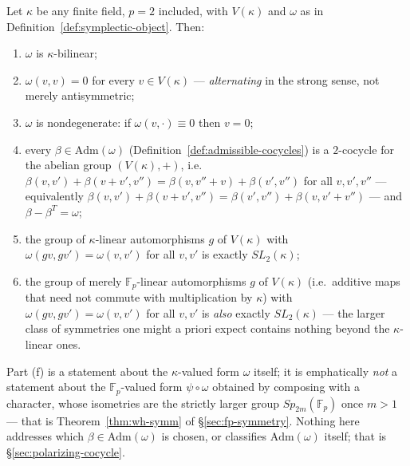 \statusProved
\begin{theorem}
\label{thm:wh-form}
Let $\kappa$ be any finite field, $p=2$ included, with $V(\kappa)$ and
$\omega$ as in Definition~\ref{def:symplectic-object}. Then:
\begin{enumerate}[label=(\alph*)]
\item $\omega$ is $\kappa$-bilinear;
\item $\omega(v,v) = 0$ for every $v \in V(\kappa)$ — \emph{alternating} in
the strong sense, not merely antisymmetric;
\item $\omega$ is nondegenerate: if $\omega(v,\cdot) \equiv 0$ then $v=0$;
\item every $\beta \in \mathrm{Adm}(\omega)$ (Definition~\ref{def:admissible-cocycles})
is a $2$-cocycle for the abelian group $(V(\kappa),+)$, i.e.
$\beta(v,v')+\beta(v+v',v'') = \beta(v,v''+v)+\beta(v',v'')$ for all
$v,v',v''$ — equivalently $\beta(v,v')+\beta(v+v',v'')=\beta(v',v'')+\beta(v,v'+v'')$
— and $\beta - \beta^T = \omega$;
\item the group of $\kappa$-linear automorphisms $g$ of $V(\kappa)$ with
$\omega(gv,gv')=\omega(v,v')$ for all $v,v'$ is exactly $SL_2(\kappa)$;
\item the group of merely $\mathbb{F}_p$-linear automorphisms $g$ of
$V(\kappa)$ (i.e.\ additive maps that need not commute with multiplication by
$\kappa$) with $\omega(gv,gv')=\omega(v,v')$ for all $v,v'$ is \emph{also}
exactly $SL_2(\kappa)$ — the larger class of symmetries one might a priori
expect contains nothing beyond the $\kappa$-linear ones.
\end{enumerate}
\end{theorem}

\begin{scope}
Part (f) is a statement about the $\kappa$-valued form $\omega$ itself; it is
emphatically \emph{not} a statement about the $\mathbb{F}_p$-valued form
$\psi\circ\omega$ obtained by composing with a character, whose isometries
are the strictly larger group $Sp_{2m}(\mathbb{F}_p)$ once $m>1$ — that is
Theorem~\ref{thm:wh-symm} of \S\ref{sec:fp-symmetry}. Nothing here addresses
which $\beta\in\mathrm{Adm}(\omega)$ is chosen, or classifies
$\mathrm{Adm}(\omega)$ itself; that is \S\ref{sec:polarizing-cocycle}.
\end{scope}


